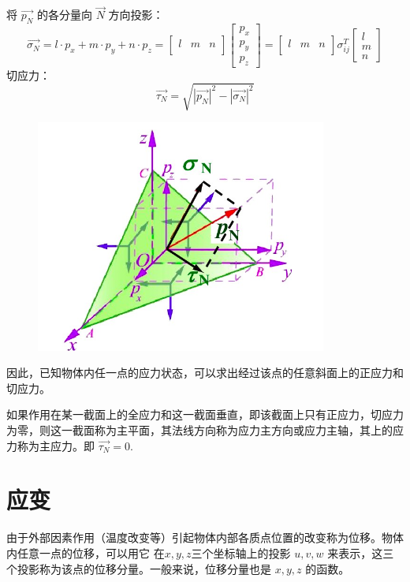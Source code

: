 \documentclass[12pt,a4paper]{article}
\begin{document}
将 $\overrightarrow{p_N}$ 的各分量向 $\overrightarrow{N}$ 方向投影：
$$
\overrightarrow{\sigma _N}=l\cdot p_x + m\cdot p_y + n\cdot p_z=
\begin{bmatrix}
l & m & n\\
\end{bmatrix}
\begin{bmatrix}
p_x \\
p_y \\
p_z
\end{bmatrix}=
\begin{bmatrix}
l & m & n\\
\end{bmatrix}\sigma _{ij}^T
\begin{bmatrix}
l \\
m \\
n
\end{bmatrix}
$$
切应力：
$$
\overrightarrow{\tau_N}=\sqrt{|\overrightarrow{p_N}|^2-|\overrightarrow{\sigma _N}|^2}
$$

\begin{figure}[H]
\centering
\includegraphics[scale=0.5]{./figures/9.png}
\caption{}
\end{figure}

因此，已知物体内任一点的应力状态，可以求出经过该点的任意斜面上的正应力和切应力。

如果作用在某一截面上的全应力和这一截面垂直，即该截面上只有正应力，切应力为零，则这一截面称为主平面，其法线方向称为应力主方向或应力主轴，其上的应力称为主应力。即 $\overrightarrow{\tau_N}=0$.

\section{应变}
由于外部因素作用（温度改变等）引起物体内部各质点位置的改变称为位移。物体内任意一点的位移，可以用它 在$x,y,z$三个坐标轴上的投影 $u,v,w$ 来表示，这三个投影称为该点的位移分量。一般来说，位移分量也是 $x,y,z$ 的函数。
\end{document}
